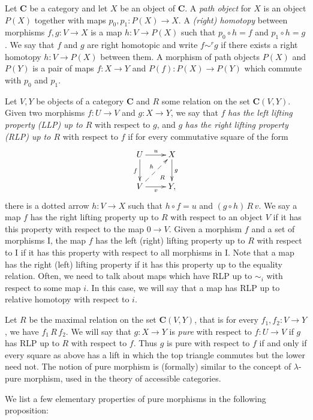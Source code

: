 \documentclass{tac}
\theoremstyle{definition}
\newcommand{\cat}[1]{\mathbf{#1}}
\newcommand{\C}{\cat{C}}
\newcommand{\I}{\mathrm{I}}
\begin{document}
Let $\C$ be a category and let $X$ be an object of $\C$.
A \emph{path object} for $X$ is an object $P(X)$ together with maps $p_0,p_1 : P(X) \to X$.
A \emph{(right) homotopy} between morphisms $f,g : V \to X$ is a map
$h : V \to P(X)$ such that $p_0 \circ h = f$ and $p_1 \circ h = g$.
We say that $f$ and $g$ are right homotopic and write $f \sim^r g$
if there exists a right homotopy $h : V \to P(X)$ between them.
A morphism of path objects $P(X)$ and $P(Y)$ is a pair of maps $f : X \to Y$ and $P(f) : P(X) \to P(Y)$ which commute with $p_0$ and $p_1$.

Let $V,Y$ be objects of a category $\C$ and $R$ some relation on the set $\C(V,Y)$.
Given two morphisms $f : U \to V$ and $g : X \to Y$, we say that $f$ \emph{has the left lifting property (LLP) up to $R$} with respect to $g$,
and $g$ \emph{has the right lifting property (RLP) up to $R$} with respect to $f$ if for every commutative square of the form
\[ \xymatrix{ U \ar[r]^u \ar@{}[dr]|(.7){R} \ar[d]_f & X \ar[d]^g \\
              V \ar[r]_v \ar@{-->}[ur]^h             & Y,
            } \]
there is a dotted arrow $h : V \to X$ such that $h \circ f = u$ and $(g \circ h)\,R\,v$.
We say a map $f$ has the right lifting property up to $R$ with respect to
an object $V$ if it has this property with respect to the map $0 \to V$.
Given a morphism $f$ and a set of morphisms $\I$, the map $f$ has the left (right) lifting property up to $R$
with respect to $\I$ if it has this property with respect to all morphisms in $\I$.
Note that a map has the right (left) lifting property if it has this property up to the equality relation.
Often, we need to talk about maps which have RLP up to $\sim_i$ with respect to some map $i$.
In this case, we will say that a map has RLP up to relative homotopy with respect to $i$.

Let $R$ be the maximal relation on the set $\C(V,Y)$, that is for every $f_1,f_2 : V \to Y$, we have $f_1\,R\,f_2$.
We will say that $g : X \to Y$ is \emph{pure} with respect to $f : U \to V$ if $g$ has RLP up to $R$ with respect to $f$.
Thus $g$ is pure with respect to $f$ if and only if every square as above has a lift in which the top triangle commutes but the lower need not.
The notion of pure morphism is (formally) similar to the concept of
$\lambda$-pure morphism, used in the theory of accessible categories.

We list a few elementary properties of pure morphisms in the following proposition:
\end{document}
